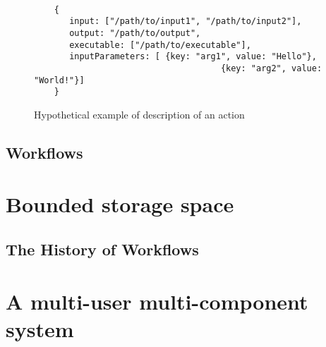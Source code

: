 \begin{figure}

\begin{mdframed}
\begin{verbatim}

	{
	   input: ["/path/to/input1", "/path/to/input2"],
	   output: "/path/to/output",
	   executable: ["/path/to/executable"],
	   inputParameters: [ {key: "arg1", value: "Hello"}, 
	                                 {key: "arg2", value: "World!"}]
	} 

\end{verbatim}
\end{mdframed}

\caption{Hypothetical example of description of an action}
\label{fig:hypothetical_inputs}
\end{figure} 


\subsection{Workflows}
\section{Bounded storage space}
\subsection{The History of Workflows}
\section{A multi-user multi-component system}